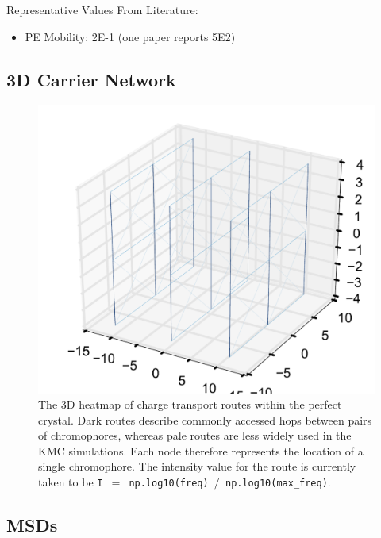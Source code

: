 \documentclass[12pt]{article}
\begin{document}
Representative Values From Literature:
\begin{itemize}
    \item{PE Mobility: 2E-1 (one paper reports 5E2)}
\end{itemize}


\clearpage

\subsection{3D Carrier Network}

\begin{figure}[h!]\centering
	\includegraphics[width=\textwidth]{Figures/3dHole.pdf}
    \caption{The 3D heatmap of charge transport routes within the perfect crystal.
    Dark routes describe commonly accessed hops between pairs of chromophores, whereas pale routes are less widely used in the KMC simulations.
    Each node therefore represents the location of a single chromophore.
The intensity value for the route is currently taken to be \texttt{I $=$ np.log10(freq) $/$ np.log10(max\_freq)}.}
	\label{fig:3dNetwork}
\end{figure}

\clearpage

\subsection{MSDs}
\end{document}
